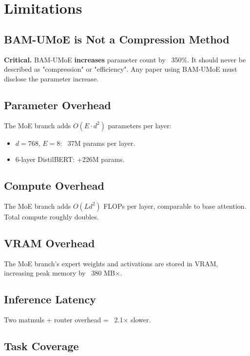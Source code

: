 \section{Limitations}

\subsection{BAM-UMoE is Not a Compression Method}

\textbf{Critical.} BAM-UMoE \textbf{increases} parameter count by ~350\%. 
It should never be described as "compression" or "efficiency". Any paper 
using BAM-UMoE must disclose the parameter increase.

\subsection{Parameter Overhead}

The MoE branch adds $O(E \cdot d^2)$ parameters per layer:
\begin{itemize}
\item $d = 768$, $E = 8$: ~37M params per layer.
\item 6-layer DistilBERT: +226M params.

\end{itemize}
\subsection{Compute Overhead}

The MoE branch adds $O(L d^2)$ FLOPs per layer, comparable to base 
attention. Total compute roughly doubles.

\subsection{VRAM Overhead}

The MoE branch's expert weights and activations are stored in VRAM, 
increasing peak memory by ~380 MB$\times$.

\subsection{Inference Latency}

Two matmuls + router overhead = ~2.1$\times$ slower.

\subsection{Task Coverage}

